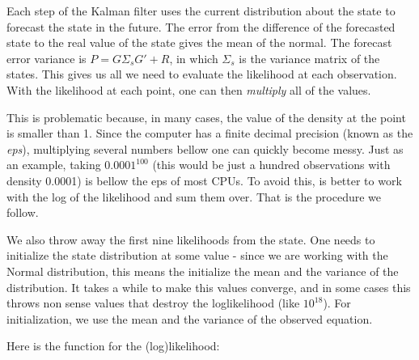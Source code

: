 \documentclass[12pt,a4paper]{article}
\begin{document}
Each step of the Kalman filter uses the current distribution about the state to forecast the state in the future. The error from the difference of the forecasted state to the real value of the state gives the mean of the normal. The forecast error variance is $P = G\Sigma_sG' + R$, in which $\Sigma_s$ is the variance matrix of the states. This gives us all we need to evaluate the likelihood at each observation. With the likelihood at each point, one can then \emph{multiply} all of the values.

This is problematic because, in many cases, the value of the density at the point is smaller than 1. Since the computer has a finite decimal precision (known as the \emph{eps}), multiplying several numbers bellow one can quickly become messy. Just as an example, taking $0.0001^{100}$ (this would be just a hundred observations with density 0.0001) is bellow the eps of most CPUs. To avoid this, is better to work with the log of the likelihood and sum them over. That is the procedure we follow.

We also throw away the first nine likelihoods from the state. One needs to initialize the state distribution at some value - since we are working with the Normal distribution, this means the initialize the mean and the variance of the distribution. It takes a while to make this values converge, and in some cases this throws non sense values that destroy the loglikelihood (like $10^{18}$). For initialization, we use the mean and the variance of the observed equation.

Here is the function for the (log)likelihood:
\end{document}
